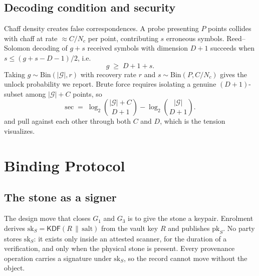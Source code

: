\documentclass[10pt,twocolumn]{article}
\theoremstyle{remark}
\newcommand{\KDF}{\textsf{KDF}}
\begin{document}
\subsection{Decoding condition and security}

Chaff density creates false correspondences. A probe presenting $P$ points
collides with chaff at rate $\approx C/N_c$ per point, contributing $s$
erroneous symbols. Reed--Solomon decoding of $g+s$ received symbols with
dimension $D+1$ succeeds when $s \leq (g+s-D-1)/2$, i.e.
\begin{equation}
g \;\geq\; D + 1 + s .
\label{eq:decode}
\end{equation}
Taking $g \sim \mathrm{Bin}(|\mathcal{G}|, r)$ with recovery rate $r$ and
$s \sim \mathrm{Bin}(P, C/N_c)$ gives the unlock probability we report. Brute
force requires isolating a genuine $(D{+}1)$-subset among $|\mathcal{G}|+C$
points, so
\begin{equation}
\mathrm{sec} \;=\; \log_2\!\binom{|\mathcal{G}|+C}{D+1} - \log_2\!\binom{|\mathcal{G}|}{D+1}.
\label{eq:vaultsec}
\end{equation}
 and  pull against each other through both $C$
and $D$, which is the tension  visualizes.

\section{Binding Protocol}
\label{sec:protocol}

\subsection{The stone as a signer}

The design move that closes $G_1$ and $G_3$ is to give the stone a keypair.
Enrolment derives $\mathrm{sk}_S = \KDF(R \,\|\, \text{salt})$ from the vault key
$R$ and publishes $\mathrm{pk}_S$. No party stores $\mathrm{sk}_S$: it exists only
inside an attested scanner, for the duration of a verification, and only when
the physical stone is present. Every provenance operation carries a signature
under $\mathrm{sk}_S$, so the record cannot move without the object.
\end{document}
